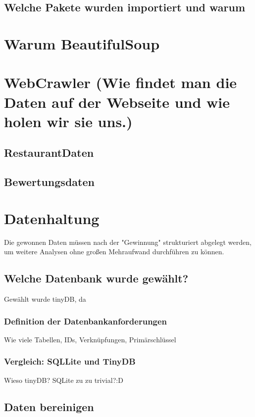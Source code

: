 \documentclass[a4paper,oneside,12pt]{report}
\begin{document}
			\subsection{Welche Pakete wurden importiert und warum}
			
		\section{Warum BeautifulSoup}
		
		\section{WebCrawler (Wie findet man die Daten auf der Webseite und wie holen wir sie uns.)}
		
			\subsection{RestaurantDaten}
			
			\subsection{Bewertungsdaten}
			
		\section{Datenhaltung}
			Die gewonnen Daten müssen nach der "Gewinnung" strukturiert abgelegt werden, um weitere Analysen ohne großen Mehraufwand durchführen zu können. 
		
			\subsection{Welche Datenbank wurde gewählt?	}
				Gewählt wurde tinyDB, da
			
				\subsubsection{Definition der Datenbankanforderungen}
					Wie viele Tabellen, IDs, Verknüpfungen, Primärschlüssel
				
				\subsubsection{Vergleich: SQLLite und TinyDB}
					Wieso tinyDB? SQLite zu zu trivial?:D
			
			\subsection{Daten bereinigen}
			
\end{document}
